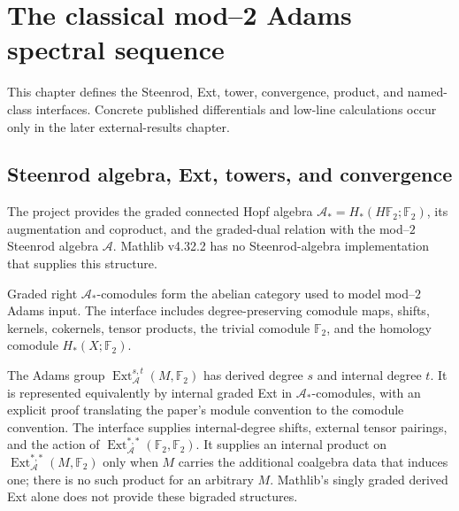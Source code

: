 \chapter{The classical mod--2 Adams spectral sequence}
\label{chap:classical-adams}

This chapter defines the Steenrod, Ext, tower, convergence, product, and named-class interfaces.  Concrete published differentials and low-line calculations occur only in the later external-results chapter.

\section{Steenrod algebra, Ext, towers, and convergence}

\begin{definition}
  \label{def:dual-steenrod-algebra}
  \notready
  The project provides the graded connected Hopf algebra
  $\mathcal A_*=H_*(H\mathbb F_2;\mathbb F_2)$, its augmentation and coproduct,
  and the graded-dual relation with the mod--$2$ Steenrod algebra $\mathcal A$.
  Mathlib v4.32.2 has no Steenrod-algebra implementation that supplies this
  structure.
\end{definition}

\begin{definition}
  \label{def:steenrod-comodule-category}
  \notready
  Graded right $\mathcal A_*$-comodules form the abelian category used to model
  mod--$2$ Adams input.  The interface includes degree-preserving comodule
  maps, shifts, kernels, cokernels, tensor products, the trivial comodule
  $\mathbb F_2$, and the homology comodule $H_*(X;\mathbb F_2)$.
\end{definition}

\begin{definition}
  \label{def:adams-bigraded-ext}
  \notready
  The Adams group $\operatorname{Ext}_{\mathcal A}^{s,t}(M,\mathbb F_2)$ has
  derived degree $s$ and internal degree $t$.  It is represented equivalently
  by internal graded Ext in $\mathcal A_*$-comodules, with an explicit proof
  translating the paper's module convention to the comodule convention.  The
  interface supplies internal-degree shifts, external tensor pairings, and the
  action of
  $\operatorname{Ext}_{\mathcal A}^{*,*}(\mathbb F_2,\mathbb F_2)$.
  It supplies an internal product on
  $\operatorname{Ext}_{\mathcal A}^{*,*}(M,\mathbb F_2)$ only when $M$ carries
  the additional coalgebra data that induces one; there is no such product for
  an arbitrary $M$.  Mathlib's singly graded derived Ext alone does not provide
  these bigraded structures.
\end{definition}

